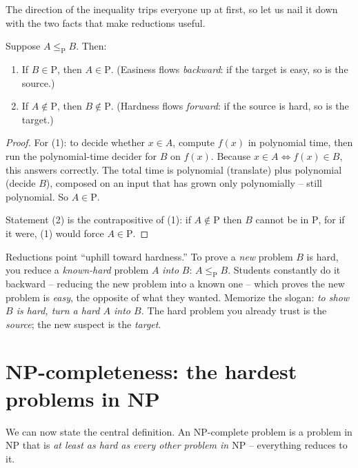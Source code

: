 The direction of the inequality trips everyone up at first, so let us nail it
down with the two facts that make reductions useful.

\begin{lemma}
\label{ch33:transfer}
Suppose $A \le_{\mathrm{P}} B$. Then:
\begin{enumerate}
  \item If $B \in \mathrm{P}$, then $A \in \mathrm{P}$. \quad(Easiness flows
        \emph{backward}: if the target is easy, so is the source.)
  \item If $A \notin \mathrm{P}$, then $B \notin \mathrm{P}$. \quad(Hardness flows
        \emph{forward}: if the source is hard, so is the target.)
\end{enumerate}
\end{lemma}

\begin{proof}
For (1): to decide whether $x \in A$, compute $f(x)$ in polynomial time, then run
the polynomial-time decider for $B$ on $f(x)$. Because $x\in A \iff f(x)\in B$,
this answers correctly. The total time is polynomial (translate) plus polynomial
(decide $B$), composed on an input that has grown only polynomially -- still
polynomial. So $A\in\mathrm{P}$.

Statement (2) is the contrapositive of (1): if $A\notin\mathrm{P}$ then $B$
cannot be in $\mathrm{P}$, for if it were, (1) would force $A\in\mathrm{P}$.
\end{proof}

\begin{trapbox}
Reductions point ``uphill toward hardness.'' To prove a \emph{new} problem $B$ is
hard, you reduce a \emph{known-hard} problem $A$ \emph{into} $B$: $A \le_{\mathrm{P}} B$. Students constantly do it backward -- reducing the new problem into a known
one -- which proves the new problem is \emph{easy}, the opposite of what they
wanted. Memorize the slogan: \emph{to show $B$ is hard, turn a hard $A$ into
$B$.} The hard problem you already trust is the \emph{source}; the new suspect is
the \emph{target}.
\end{trapbox}

\section{NP-completeness: the hardest problems in NP}

We can now state the central definition. An NP-complete problem is a problem in
$\mathrm{NP}$ that is \emph{at least as hard as every other problem in
$\mathrm{NP}$} -- everything reduces to it.

